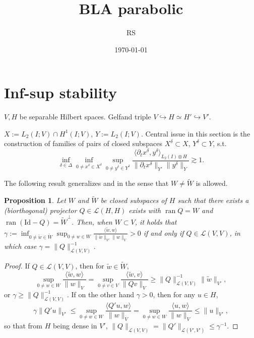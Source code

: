 \documentclass{amsart}
\title{BLA parabolic}
\date{\today}
\author{RS}
\newtheorem{proposition}[theorem]{Proposition}
\theoremstyle{definition}
\theoremstyle{remark}
\numberwithin{equation}{section}
\newcommand{\cL}{\mathcal L}
\newcommand{\identity}{\mathrm{Id}}
\DeclareMathOperator{\ran}{ran}
\newcommand{\be}{\begin{equation}}
\newcommand{\ee}{\end{equation}}
\newcommand{\1}{\mathbb 1}
\begin{document}
\begin{abstract}  
\end{abstract}

\maketitle

\section{Inf-sup stability} \label{Sinfsup}
$V, H$ be separable Hilbert spaces. Gelfand triple $V \hookrightarrow H \simeq H' \hookrightarrow V'$.

$X:=L_2(I;V) \cap H^1(I;V)$, $Y:=L_2(I;V)$.
Central  issue in this section is the construction of families of pairs of closed subspaces $X^\delta \subset X$, $Y^\delta \subset Y$, s.t.
\be \label{infinfsup}
\inf_{\delta \in \Delta} \inf_{0 \neq x^\delta \in X^\delta} \sup_{0 \neq y^\delta \in Y^\delta} \frac{\langle \partial_t x^\delta,y^\delta \rangle_{L_2(I)\otimes H}}{\|\partial_t x^\delta\|_{Y'}\|y^\delta\|_{Y}} \gtrsim1.
\ee

The following result generalizes \cite[Lemma 6.2]{11} and \cite[Proposition 2.5]{258.4} in the sense that $W \neq \tilde W$ is allowed.

\begin{proposition} \label{prop1} Let $W$ and $\tilde W$ be closed subspaces of $H$ such that there exists a (biorthogonal) projector $Q \in \cL(H,H)$  exists with $\ran Q=W$ and $\ran (\identity -Q)={\tilde W}^\perp$. 
Then, when $W \subset V$, it holds that $\gamma:=\inf_{0 \neq \tilde w \in \tilde W}\sup_{0 \neq w \in W}\frac{\langle \tilde w,w\rangle}{\|\tilde w\|_{V'}\|w\|_V}>0$ if and only if $Q \in \cL(V,V)$, in which case $\gamma=\|Q\|_{\cL(V,V)}^{-1}$.
\end{proposition}

\begin{proof} If $Q\in \cL(V,V)$, then for $\tilde w \in \tilde W$,
$$
\sup_{0 \neq w \in W}\frac{\langle \tilde w,w\rangle}{\|w\|_V}=\sup_{0 \neq v \in V}\frac{\langle \tilde w, v\rangle}{\|Qv\|_V}
\geq \|Q\|_{\cL(V,V)}^{-1} \|\tilde w\|_{V'},
$$
or $\gamma \geq \|Q\|_{\cL(V,V)}^{-1}$. If on the other hand $\gamma>0$, then for any $u \in H$,
$$
\gamma \|Q' u\|_{V'} \leq \sup_{0 \neq w \in W}\frac{\langle Q'u,w\rangle}{\|w\|_V} =
 \sup_{0 \neq w \in W}\frac{\langle u,w\rangle}{\|w\|_V} \leq \|u\|_{V'},
 $$
so that from $H$ being dense in $V'$, $\|Q\|_{\cL(V,V)}=\|Q'\|_{\cL(V',V')}\leq \gamma^{-1}$.
\end{proof}
\end{document}
